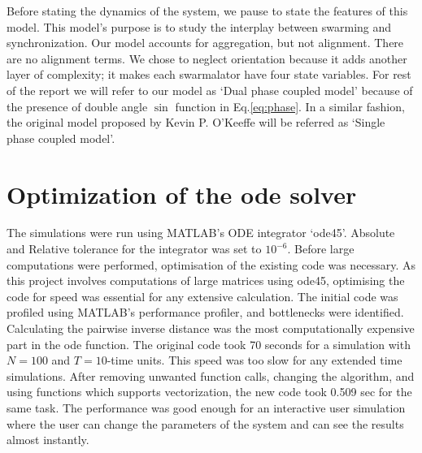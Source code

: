 \documentclass[twocolumn,10pt]{asme2ej}
\begin{document}
{    Before stating the dynamics of the system, we pause to state the features of this model. This model's purpose is to study the interplay between swarming and synchronization. Our model accounts for aggregation, but not alignment. There are no alignment terms.  We chose to neglect orientation because it adds another layer of complexity; it makes each swarmalator have four state variables. For rest of the report we will refer to our model as `Dual phase coupled model' because of the presence of double angle $\sin$ function in Eq.\ref{eq:phase}. In a similar fashion, the original model proposed by Kevin P. O'Keeffe will be referred as `Single phase coupled model'.\noindent
}
\section{Optimization of the ode solver}
{
    The simulations were run using MATLAB's ODE integrator `ode45'. Absolute and Relative tolerance for the integrator was set to $10^{-6}$. Before large computations were performed, optimisation of the existing code was necessary. As this project involves computations of large matrices using ode45, optimising the code for speed was essential for any extensive calculation. The initial code was profiled using MATLAB's performance profiler, and bottlenecks were identified. Calculating the pairwise inverse distance was the most computationally expensive part in the ode function. The original code took 70 seconds for a simulation with $N = 100$ and $T = 10$-time units. This speed was too slow for any extended time simulations. After removing unwanted function calls, changing the algorithm, and using functions which supports vectorization, the new code took 0.509 sec for the same task. The performance was good enough for an interactive user simulation where the user can change the parameters of the system and can see the results almost instantly.
}



\end{document}
